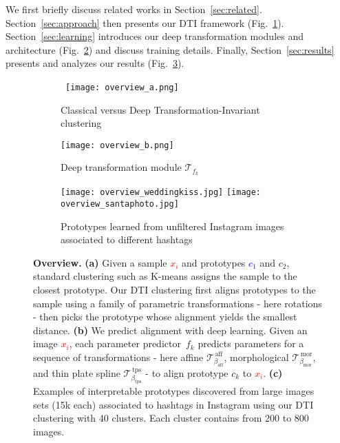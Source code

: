 \documentclass{article}
\newcommand{\red}[1]{\textcolor{red}{#1}}
\newcommand{\green}[1]{\textcolor{mygreen}{#1}}
\newcommand{\blue}[1]{\textcolor{blue}{#1}}
\newcommand{\orange}[1]{\textcolor{myorange}{#1}}
\begin{document}
We first briefly discuss related works in Section~\ref{sec:related}.  
Section~\ref{sec:approach} then presents our DTI framework (Fig.~\ref{fig:method_a}).  
Section~\ref{sec:learning} introduces our deep transformation modules and architecture 
(Fig.~\ref{fig:method_b}) and discuss training details. Finally, Section~\ref{sec:results} 
presents and analyzes our results (Fig.~\ref{fig:teaser}). 
\begin{figure}
    \centering
    \begin{subfigure}[t]{\textwidth}
    \centering
    \qquad\qquad\qquad\,
    \texttt{[image: overview\_a.png]}
    \caption{Classical versus Deep Transformation-Invariant clustering}
    \label{fig:method_a}
    \end{subfigure}
    \begin{subfigure}[t]{\textwidth}
    \centering
    \texttt{[image: overview\_b.png]}
    \caption{Deep transformation module $\mathcal{T}_{f_k}$}
    \label{fig:method_b}
    \end{subfigure}
    \begin{subfigure}[t]{\textwidth}
    \centering
    \vspace{0.4em}
    \texttt{[image: overview\_weddingkiss.jpg]}
    \texttt{[image: overview\_santaphoto.jpg]}
    \caption{Prototypes learned from unfiltered Instagram images associated to different 
    hashtags}
    \label{fig:teaser}
    \end{subfigure}

    \caption{\textbf{Overview.}  \textbf{(a)} Given a sample \red{$x_i$} and prototypes 
      \blue{$c_1$} and \green{$c_2$}, standard clustering such as K-means assigns the sample 
      to the closest prototype.
    Our DTI clustering first aligns prototypes to the sample using a family of parametric 
    transformations - here rotations - then picks the prototype whose alignment yields the 
    smallest distance.
    \textbf{(b)} We predict alignment with deep learning.
    Given an image \red{$x_i$}, each parameter predictor~\orange{$f_k$} predicts parameters 
    for a sequence of transformations - here affine 
    \orange{$\mathcal{T}^{\,\textrm{aff}}_{\beta_{\textrm{aff}}}$}, morphological \orange{$ 
    \mathcal{T}^{\,\textrm{mor}}_{\beta_{\textrm{mor}}}$}, and thin plate spline 
    \orange{$\mathcal{T}^{\,\textrm{tps}}_{\beta_{\textrm{tps}}}$}
    - to align prototype {$c_k$} to \red{$x_i$}.
    \textbf{(c)} Examples of interpretable prototypes discovered from large images sets (15k 
  each) associated to hashtags in Instagram using our DTI clustering with 40 clusters.  Each 
cluster contains from 200 to 800 images.}
    \label{fig:overview_DTI}
    \vspace{-1.5em}
\end{figure}
\end{document}
